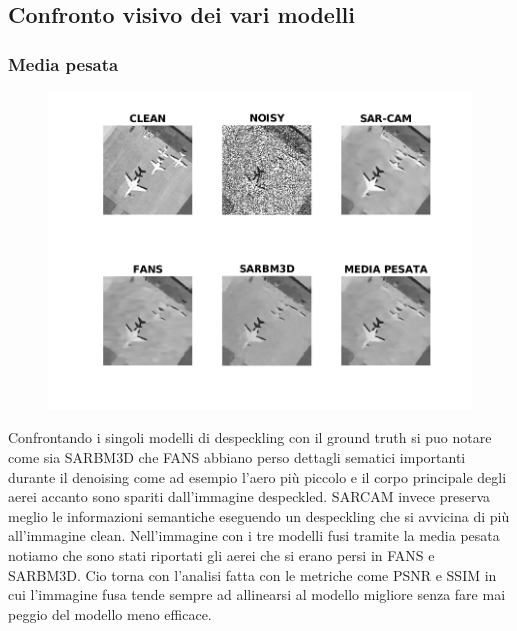   \subsection{Confronto visivo dei vari modelli}
  \subsubsection{Media pesata}
  \begin{figure}[H]
    \centering
    \includegraphics[width=1.1\textwidth]{utils/MPairplane00.png}
    \caption{}
    \label{fig:airplane00MP}
  \end{figure}
Confrontando i singoli modelli di despeckling con il ground truth si puo notare come sia SARBM3D che FANS abbiano 
perso dettagli sematici importanti durante il denoising come ad esempio l'aero più piccolo e il corpo principale degli aerei accanto sono spariti dall'immagine despeckled.
SARCAM invece preserva meglio le informazioni semantiche eseguendo un despeckling che si avvicina di più all'immagine clean.
Nell'immagine con i tre modelli fusi tramite la media pesata notiamo che sono stati riportati gli aerei che si erano persi in FANS e SARBM3D. 
Cio torna con l'analisi fatta con le metriche come PSNR e SSIM in cui l'immagine fusa tende sempre ad allinearsi al modello migliore senza fare mai 
peggio del modello meno efficace.
